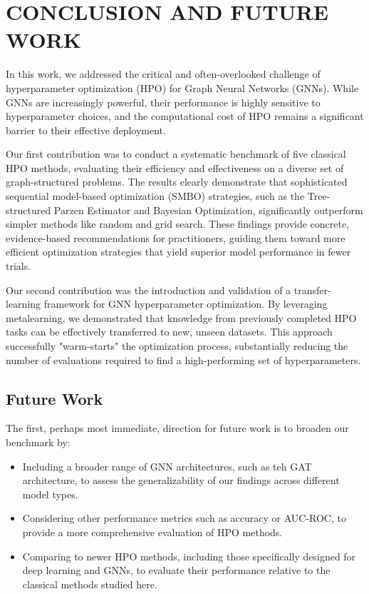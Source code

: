 \section{\uppercase{Conclusion and Future work}}
\label{sec:conclusion}

In this work, we addressed the critical and often-overlooked challenge of hyperparameter optimization (HPO) for Graph Neural Networks (GNNs). While GNNs are increasingly powerful, their performance is highly sensitive to hyperparameter choices, and the computational cost of HPO remains a significant barrier to their effective deployment.

Our first contribution was to conduct a systematic benchmark of five classical HPO methods, evaluating their efficiency and effectiveness on a diverse set of graph-structured problems. The results clearly demonstrate that sophisticated sequential model-based optimization (SMBO) strategies, such as the Tree-structured Parzen Estimator and Bayesian Optimization, significantly outperform simpler methods like random and grid search. These findings provide concrete, evidence-based recommendations for practitioners, guiding them toward more efficient optimization strategies that yield superior model performance in fewer trials.

Our second contribution was the introduction and validation of a transfer-learning framework for GNN hyperparameter optimization. By leveraging metalearning, we demonstrated that knowledge from previously completed HPO tasks can be effectively transferred to new, unseen datasets. This approach successfully "warm-starts" the optimization process, substantially reducing the number of evaluations required to find a high-performing set of hyperparameters.

\subsection{Future Work}

The first, perhaps most immediate, direction for future work is to broaden our benchmark by:
\begin{itemize}
	\item Including a broader range of GNN architectures, such as teh GAT architecture, to assess the generalizability of our findings across different model types.
	\item Considering other performance metrics such as accuracy or AUC-ROC, to provide a more comprehensive evaluation of HPO methods.
	\item Comparing to newer HPO methods, including those specifically designed for deep learning and GNNs, to evaluate their performance relative to the classical methods studied here.
\end{itemize}

